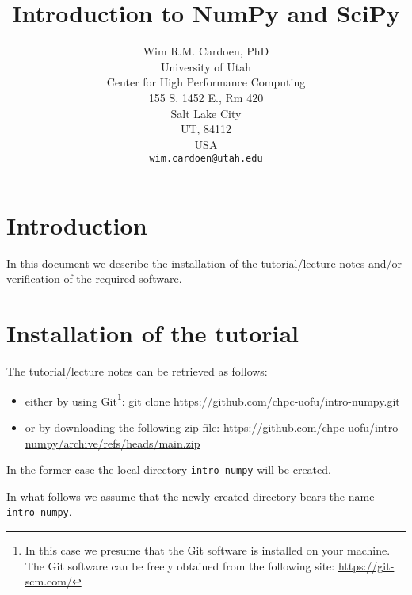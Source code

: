 \documentclass[11pt]{article}
\begin{document}
\title{Introduction to NumPy and SciPy}
\author{Wim R.M. Cardoen, PhD\\
        University of Utah\\
        Center for High Performance Computing\\
        155 S. 1452 E., Rm 420\\
        Salt Lake City\\
        UT, 84112\\
        USA\\
	\texttt{wim.cardoen@utah.edu}}
\renewcommand{\today}{Aug 22, 2024}
\renewcommand{\labelitemii}{$\star$}
\maketitle

\section*{Introduction}
In this document we describe the installation of the tutorial/lecture notes 
and/or verification of the required software.

\renewcommand \thesection{\Roman{section}}
\section{Installation of the tutorial}
The tutorial/lecture notes can be retrieved as follows:
\begin{itemize}
\item either by using Git\footnote{In this case we presume that the Git software is installed on your machine. 
	The Git software can be freely obtained from the following site: \href{https://git-scm.com/}{https://git-scm.com/}}:\newline
		\href{git clone https://github.com/chpc-uofu/intro-numpy.git}{git clone https://github.com/chpc-uofu/intro-numpy.git}
\item or by downloading the following zip file:\newline
	\href{https://github.com/chpc-uofu/intro-numpy/archive/refs/heads/main.zip}{https://github.com/chpc-uofu/intro-numpy/archive/refs/heads/main.zip}
\end{itemize}
In the former case the local directory \texttt{intro-numpy} 
will be created. 

In what follows we assume that the newly created directory bears the name \texttt{intro-numpy}.  
\end{document}
